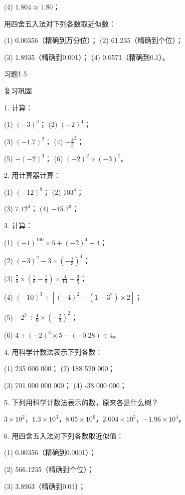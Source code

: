 \documentclass{article}
\begin{document}
\begin{article}
\begin{example}
(4) $1.804 \approx 1.80$；

\end{example}

\begin{exeicise}

用四舍五入法对下列各数取近似数：

(1) 0.00356（精确到万分位）；    (2) 61.235（精确到个位）；

(3) 1.8935（精确到0.001）；      (4) 0.0571（精确到0.1）。

习题1.5

复习巩固

1. 计算：

    (1) ${(-3)}^3$；    (2) ${(-2)}^4$；
    
    (3) ${(-1.7)}^2$；  (4) ${-\frac{4}{3}}^3$；
    
    (5) $-{(-2)}^3$；   (6) ${(-2)}^2 \times {(-3)}^2$。

2. 用计算器计算：

    (1) ${(-12)}^8$；    (2) $103^4$；
    
    (3) $7.12^3$；       (4) ${-45.7}^3$；

3. 计算：

    (1) ${(-1)}^100 \times 5 + {(-2)}^4 \div 4$；    
    
    (2) ${(-3)}^2-3\times {(-\frac{1}{3})}^4$；
    
    (3) $\frac{7}{6} \times (\frac{1}{6}-\frac{1}{3})\times \frac{3}{14}\div \frac{3}{5}$；  
    
    (4) ${(-10)}^3+[{(-4)}^2-(1-3^2)\times 2]$；
    
    (5) $-2^3\div \frac{4}{9} \times {(-\frac{2}{3})}^2$；   
    
    (6) $4+{(-2)}^3\times 5-(-0.28)\div 4$。

4. 用科学计数法表示下列各数：

    (1) 235 000 000；       (2) 188 520 000；
    
    (3) 701 000 000 000；   (4) -38 000 000；

5. 下列用科学计数法表示的数，原来各是什么树？
    
    $3\times 10^2$，$1.3\times 10^3$，$8.05\times 10^6$，$2.004\times 10^5$，$-1.96\times 10^4$。

6. 用四舍五入法对下列各数取近似值：

    (1) 0.00356（精确到0.0001）；    
    
    (2) 566.1235（精确到个位）；
    
    (3) 3.8963（精确到0.01）；  
    

\end{exeicise}
\end{article}
\end{document}
